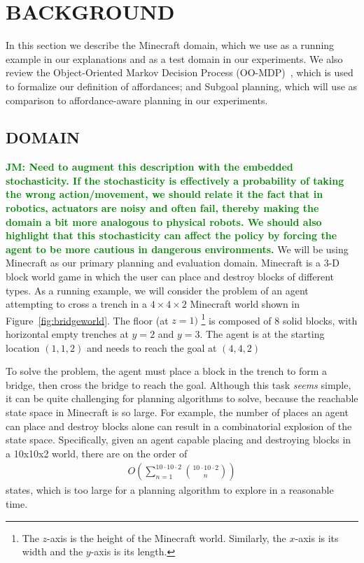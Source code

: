 \documentclass[]{article}
\newcommand{\jmnote}[1]{\textcolor{Green}{\textbf{JM: #1}}}
\begin{document}
\section{BACKGROUND}

In this section we describe the Minecraft domain, which we use
as a running example in our explanations and as a test domain in our experiments.
We also review the
Object-Oriented Markov Decision Process (OO-MDP)~\citep{diuk08}, which is
used to formalize our definition of affordances; and Subgoal planning, which
will use as comparison to affordance-aware planning in our experiments.

\subsection{DOMAIN}

\jmnote{Need to augment this description with the embedded stochasticity. If the stochasticity
is effectively a probability of taking the wrong action/movement, we should relate it
the fact that in robotics, actuators are noisy and often fail, thereby making the domain
a bit more analogous to physical robots. We should also highlight that this stochasticity
can affect the policy by forcing the agent to be more cautious in dangerous environments.}
We will be using Minecraft as our primary planning and evaluation domain. Minecraft
is a 3-D block world game in which the user can place and destroy blocks of
different types. As a running example, we will consider the problem of an agent
attempting to cross a trench in a $4 \times 4 \times 2$ Minecraft world shown
in Figure~\ref{fig:bridgeworld}. The floor (at $z = 1)$ \footnote{The $z$-axis
is the height of the Minecraft world. Similarly, the $x$-axis is its width and the
$y$-axis is its length.} is composed of 8 solid blocks, with horizontal empty
trenches at $y = 2$ and $y = 3$. The agent is  at the starting location
$(1, 1, 2)$ and needs to reach the goal at $(4,4,2)$

To solve the problem, the agent must
place a block in the trench to form a bridge, then cross the bridge
to reach the goal. Although this task {\em seems} simple, it can be quite
challenging for planning algorithms to solve, because the reachable
state space in Minecraft is so large. For example, the number of places
an agent can place and destroy blocks alone can result in 
a combinatorial explosion of the state space. Specifically,
given an agent capable placing and destroying blocks in a 
10x10x2 world, there are on the order of
\begin{align}
O\left(\sum_{n=1}^{10 \cdot 10 \cdot 2} \binom{10 \cdot 10 \cdot 2}{n}\right)
\label{eq:mc_explode}
\end{align}
states, which is too large for a planning algorithm to explore in a reasonable
time.
\end{document}
